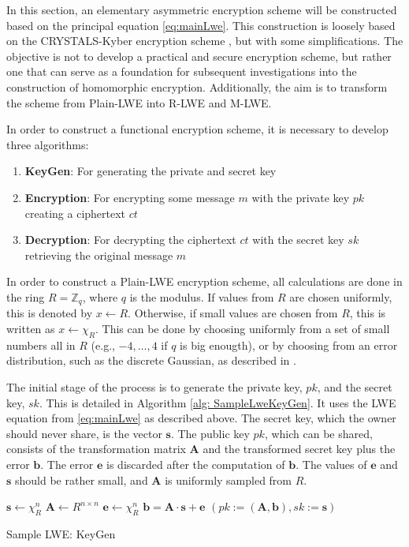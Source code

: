 In this section, an elementary asymmetric encryption scheme will be constructed based on the principal equation \ref{eq:mainLwe}. This construction is loosely based on the CRYSTALS-Kyber encryption scheme \cite{CyrstalsKyber}, but with some simplifications. The objective is not to develop a practical and secure encryption scheme, but rather one that can serve as a foundation for subsequent investigations into the construction of homomorphic encryption. Additionally, the aim is to transform the scheme from Plain-LWE into R-LWE and M-LWE.

In order to construct a functional encryption scheme, it is necessary to develop three algorithms:

\begin{enumerate}
  \item \textbf{KeyGen}: For generating the private and secret key
  \item \textbf{Encryption}: For encrypting some message $m$ with the private key $pk$ creating a ciphertext $ct$
  \item \textbf{Decryption}: For decrypting the ciphertext $ct$ with the secret key $sk$ retrieving the original message $m$
\end{enumerate}

In order to construct a Plain-LWE encryption scheme, all calculations are done in the ring $R = \mathbb{Z}_q$, where $q$ is the modulus. If values from $R$ are chosen uniformly, this is denoted by $x \leftarrow R$. Otherwise, if small values are chosen from $R$, this is written as $x \leftarrow \chi_R$. This can be done by choosing uniformly from a set of small numbers all in $R$ (e.g., ${-4,\ldots, 4}$ if $q$ is big enougth), or by choosing from an error distribution, such as the discrete Gaussian, as described in \cite{Regev2005OnLL}.

The initial stage of the process is to generate the private key, $pk$, and the secret key, $sk$. This is detailed in Algorithm \ref{alg: SampleLweKeyGen}. It uses the LWE equation from \ref{eq:mainLwe} as described above. The secret key, which the owner should never share, is the vector $\textbf{s}$. The public key $pk$, which can be shared, consists of the transformation matrix $\textbf{A}$ and the transformed secret key plus the error $\textbf{b}$. The error $\textbf{e}$ is discarded after the computation of $\textbf{b}$. The values of $\textbf{e}$ and $\textbf{s}$ should be rather small, and $\textbf{A}$ is uniformly sampled from $R$.

\begin{algorithm}[htb]
  \begin{algorithmic}[1]
    \STATE $\textbf{s} \leftarrow \chi_R^n$
    \STATE $\textbf{A} \leftarrow R^{n \times n}$
    \STATE $\textbf{e} \leftarrow \chi_R^n$
    \STATE $\textbf{b} = \textbf{A}\cdot \textbf{s}+\textbf{e}$
    \RETURN $(pk:=(\textbf{A}, \textbf{b}), sk:=\textbf{s} )$
  \end{algorithmic}
  \caption{Sample LWE: KeyGen}
  \label{alg: SampleLweKeyGen}
\end{algorithm}

